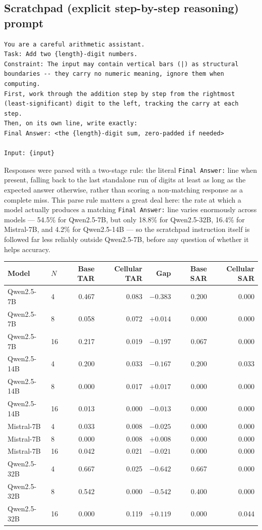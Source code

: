 \documentclass[11pt]{article}
\begin{document}
\subsection*{Scratchpad (explicit step-by-step reasoning) prompt}
\begin{verbatim}
You are a careful arithmetic assistant.
Task: Add two {length}-digit numbers.
Constraint: The input may contain vertical bars (|) as structural
boundaries -- they carry no numeric meaning, ignore them when computing.
First, work through the addition step by step from the rightmost
(least-significant) digit to the left, tracking the carry at each step.
Then, on its own line, write exactly:
Final Answer: <the {length}-digit sum, zero-padded if needed>

Input: {input}
\end{verbatim}

Responses were parsed with a two-stage rule: the literal \texttt{Final Answer:} line when present, falling back to the last standalone run of digits at least as long as the expected answer otherwise, rather than scoring a non-matching response as a complete miss. This parse rule matters a great deal here: the rate at which a model actually produces a matching \texttt{Final Answer:} line varies enormously across models --- 54.5\% for Qwen2.5-7B, but only 18.8\% for Qwen2.5-32B, 16.4\% for Mistral-7B, and 4.2\% for Qwen2.5-14B --- so the scratchpad instruction itself is followed far less reliably outside Qwen2.5-7B, before any question of whether it helps accuracy.

\begin{table}[htbp]
\centering
\small
\begin{tabular}{llrrrrr}
\toprule
Model & $N$ & Base TAR & Cellular TAR & Gap & Base SAR & Cellular SAR \\
\midrule
Qwen2.5-7B & 4 & 0.467 & 0.083 & $-0.383$ & 0.200 & 0.000 \\
Qwen2.5-7B & 8 & 0.058 & 0.072 & $+0.014$ & 0.000 & 0.000 \\
Qwen2.5-7B & 16 & 0.217 & 0.019 & $-0.197$ & 0.067 & 0.000 \\
Qwen2.5-14B & 4 & 0.200 & 0.033 & $-0.167$ & 0.200 & 0.033 \\
Qwen2.5-14B & 8 & 0.000 & 0.017 & $+0.017$ & 0.000 & 0.000 \\
Qwen2.5-14B & 16 & 0.013 & 0.000 & $-0.013$ & 0.000 & 0.000 \\
Mistral-7B & 4 & 0.033 & 0.008 & $-0.025$ & 0.000 & 0.000 \\
Mistral-7B & 8 & 0.000 & 0.008 & $+0.008$ & 0.000 & 0.000 \\
Mistral-7B & 16 & 0.042 & 0.021 & $-0.021$ & 0.000 & 0.000 \\
Qwen2.5-32B & 4 & 0.667 & 0.025 & $-0.642$ & 0.667 & 0.000 \\
Qwen2.5-32B & 8 & 0.542 & 0.000 & $-0.542$ & 0.400 & 0.000 \\
Qwen2.5-32B & 16 & 0.000 & 0.119 & $+0.119$ & 0.000 & 0.044 \\
\bottomrule
\end{tabular}
\end{table}
\end{document}
